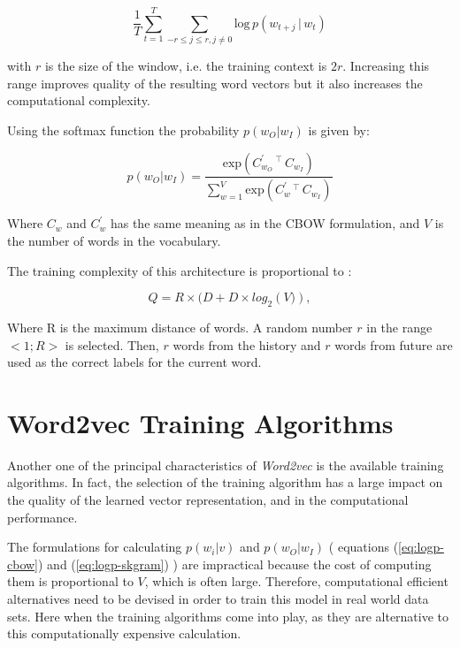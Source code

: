  \begin{equation}
  \label{eq:sumprob-cbow}
   \frac{1}{T} \sum^{T}_{t=1}{\sum_{-r \leq j \leq r, j \neq 0}\text{log} \, p
     \left( w_{t+j} \, |\, w_t  \right)}
\end{equation}

with $r$ is the size of the window, i.e. the training context is $2r$.
Increasing this range improves quality of the resulting word vectors but it
also increases the computational complexity.

Using the softmax function the probability  $p(w_O|w_I)$ is given by:

\begin{equation}
  \label{eq:logp-skgram}
  p(w_O|w_I) = \frac{\text{exp}\left(C^{'}_{w_O}\,^\top\,C_{w_I} \right)
  }{\sum^{V}_{w=1} \text{exp} \left( C^{'}_w \,^\top\, C_{w_I} \right)   }  
\end{equation}


Where $C_w$ and $C^{'}_w$  has the same meaning as in the \ac{CBOW}
formulation,  and $V$ is the number of words in the vocabulary.

The training complexity of this architecture is proportional to
\cite{DBLP:journals/corr/abs-1301-3781}:

\begin{equation}
  Q = R \times (D + D \times log_2 \left(V)\right),  
\end{equation}

Where R is the maximum distance of words. A random number $r$ in the range $<
1; R >$ is selected. Then, $r$ words from the history and $r$ words from future are used as the correct labels for the current word.
 

\section{Word2vec Training Algorithms}
\label{sec:word2v-tran-algorithms}
Another one of the principal  characteristics of  \textit{Word2vec} is the
available training algorithms. In
fact, the selection of the training algorithm has a large  impact on
 the quality of the learned vector representation,  and in the
computational performance.

The formulations for calculating $p(w_i|v)$ and  $p(w_O|w_I)$  ( equations
(\ref{eq:logp-cbow})  and  (\ref{eq:logp-skgram}) ) are impractical because
the cost of computing them is proportional to $V$, which is often large.
Therefore, computational efficient alternatives need to be devised in order to
train this model in real world data sets. Here when the training algorithms
come into play, as they are alternative to this computationally expensive
calculation. 


